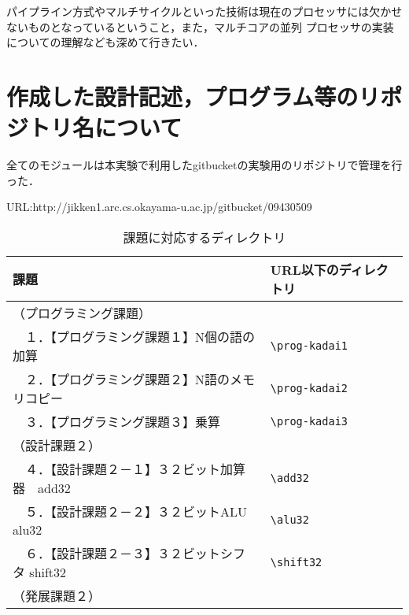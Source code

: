 \documentclass{jarticle}[11pt]
\begin{document}
  パイプライン方式やマルチサイクルといった技術は現在のプロセッサには欠かせないものとなっているということ，また，マルチコアの並列
  プロセッサの実装についての理解なども深めて行きたい．


  \section{作成した設計記述，プログラム等のリポジトリ名について}\label{sec:作成した設計記述，プログラム等のリポジトリ名，ファイル名の一覧}
  全てのモジュールは本実験で利用したgitbucketの実験用のリポジトリで管理を行った．
  
  URL:http://jikken1.arc.cs.okayama-u.ac.jp/gitbucket/09430509

  \begin{table*}[h]
    \caption{課題に対応するディレクトリ}
    \label{課題に対応するディレクトリ}
    \begin{center}
      \begin{tabular}{l|l}
        \hline \hline
        課題 &
        URL以下のディレクトリ
        \\ \hline

        （プログラミング課題）&
        \\
      
        　１．【プログラミング課題１】N個の語の加算&
        \verb|\prog-kadai1|
        \\ 
      
        　２．【プログラミング課題２】N語のメモリコピー&
        \verb|\prog-kadai2|
        \\ 
      
        　３．【プログラミング課題３】乗算&
        \verb|\prog-kadai3|
        \\
      
        （設計課題２）&
        \\
      
        　４．【設計課題２－１】３２ビット加算器　add32&
        \verb|\add32|
        \\ 
      
        　５．【設計課題２－２】３２ビットALU　alu32&
        \verb|\alu32|
        \\ 
      
        　６．【設計課題２－３】３２ビットシフタ shift32&
        \verb|\shift32|
        \\ 
      
        （発展課題２）&
        \\ 
      

\end{tabular}
\end{center}
\end{table*}
\end{document}
